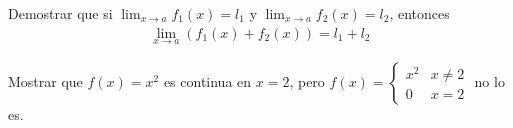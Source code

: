 {}
  \begin{problema}
  Demostrar que si $\lim_{x\to a}f_{1}(x)=l_{1}$ y $\lim_{x\to a}f_{2}(x)=l_{2}$, entonces 
  \begin{align*}
   \lim_{x\to a}\left( f_{1}(x)+f_{2}(x) \right)=l_{1}+l_{2}
   \end{align*}
  \end{problema}


{}
  \begin{problema}
   Mostrar que $f(x)=x^{2}$ es continua en $x=2$, pero $f(x)= \begin{cases}
x^{2} & x\neq 2 \\
0 & x =2
\end{cases}$ no lo es. 
  \end{problema}


